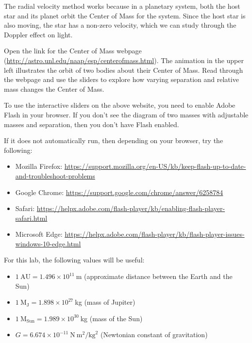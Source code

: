 The radial velocity method works because in a planetary system, both the host star and its planet orbit the Center of Mass for the system. Since the host star is also moving, the star has a non-zero velocity, which we can study through the Doppler effect on light.

Open the link for the Center of Mass webpage (\url{http://astro.unl.edu/naap/esp/centerofmass.html}). The animation in the upper left illustrates the orbit of two bodies about their Center of Mass. Read through the webpage and use the sliders to explore how varying separation and relative mass changes the Center of Mass.

\begin{framed}
	To use the interactive sliders on the above website, you need to enable Adobe Flash in your browser. If you don't see the diagram of two masses with adjustable masses and separation, then you don't have Flash enabled.
	
	If it does not automatically run, then depending on your browser, try the following:
	\begin{itemize}
		\item Mozilla Firefox: \url{https://support.mozilla.org/en-US/kb/keep-flash-up-to-date-and-troubleshoot-problems}
		
		\item Google Chrome: \url{https://support.google.com/chrome/answer/6258784}
		
		\item Safari: \url{https://helpx.adobe.com/flash-player/kb/enabling-flash-player-safari.html}
		
		\item Microsoft Edge: \url{https://helpx.adobe.com/flash-player/kb/flash-player-issues-windows-10-edge.html}
	\end{itemize}
\end{framed}

For this lab, the following values will be useful:
\begin{itemize}
	\item $1\:\textrm{AU} = 1.496 \times 10^{11}\:$m (approximate distance between the Earth and the Sun)
	
	\item $1\:\textrm{M}_\textrm{J} = 1.898 \times 10^{27}\:$kg (mass of Jupiter)
	
	\item $1\:\textrm{M}_\textrm{Sun} = 1.989 \times 10^{30}\:$kg (mass of the Sun)
	
	\item $G = 6.674 \times 10^{-11}\:\mathrm{N}\:\mathrm{m}^2/\mathrm{kg}^2$ (Newtonian constant of gravitation)
\end{itemize}

